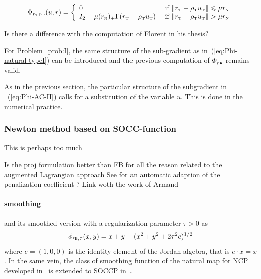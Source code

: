 \begin{equation}
  \label{eq:Phi-CKPS-II-rtrt}
  \Phi_{r_\t r_\t}(u,r) =   
  \left\{
    \begin{array}{ll}
      0 & \text{ if }  \|r_{\t}  - \rho_{\t} u_{\t}\| \leq  \mu r_{\n}\\
      I_2-\mu (r_{\n})_+ \Gamma(r_{\t} - \rho_{\t} u_{\t})    &  \text{ if }
        \|r_{\t}  - \rho_{\t} u_{\t}\| >  \mu r_{\n}  \\
    \end{array}\right. 
\end{equation}

\begin{ndrva}
  \begin{list}{*}{}
  \item     Is    there    a    difference    with    the    computation    of    Florent    in    his    thesis?
  \item 
  \end{list}
\end{ndrva}


For Problem~\ref{prob:I}, the same structure of the sub-gradient as in~(\ref{eq:Phi-natural-typeI}) can be introduced and the previous computation of $\Phi_{r\bullet}$ remains valid.

\begin{remark}
  As in the previous section, the particular structure of the subgradient in ~(\ref{eq:Phi-AC-II}) calls for a substitution of the variable $u$. This is done in the numerical practice.
\end{remark}

\subsubsection{Newton method based on  SOCC-function}
\label{Sec:Num-SOCCP}

\begin{ndrva}
  This is perhaps  too much
\end{ndrva}


\begin{ndrva}
  Is the proj formulation better than FB for all the reason related to the augmented Lagrangian approach
  See \cite{Mirar.Arora_SMO2004-I} for an automatic adaption of the penalization coefficient ? Link woth the work of Armand
\end{ndrva}



\paragraph{smoothing}
and its smoothed version with a regularization parameter $\tau>0$ as
\begin{equation}
  \label{eq:Jordan-FB-smoothed}
  \phi_{\fb, \tau}(x,y) = x+y - (x^2 + y^2 + 2 \tau^2 e)^{1/2}
\end{equation}
where $e = (1,0,0)$ is the identity element of the Jordan algebra, that is $e \cdot x =x$. In the same vein, the class of smoothing function of the natural map for NCP developed in~\cite{Chen.Mangasarian1996} is extended to SOCCP in~\cite{Fukushima.ea2001}.



